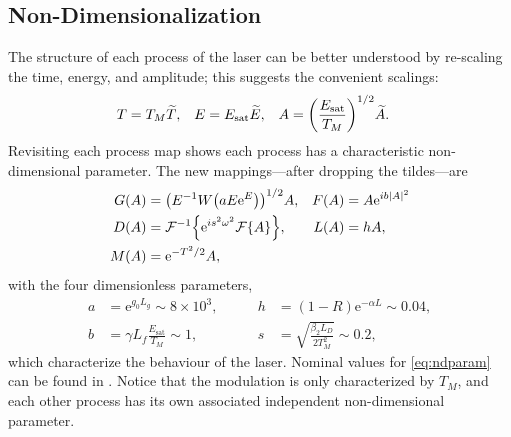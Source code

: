 \documentclass[10pt,twocolumn,a4paper]{article}
\let\originalleft\left
\let\originalright\right
\renewcommand{\left}{\mathopen{}\mathclose\bgroup\originalleft}
\renewcommand{\right}{\aftergroup\egroup\originalright}
\newcommand{\Es}{E_{\textrm{sat}}}
\newcommand{\FT}[1]{\mathcal{F}\left\{ #1 \right\}}
\newcommand{\FTi}[1]{\mathcal{F}^{-1}\left\{ #1 \right\}}
\begin{document}
\subsection{Non-Dimensionalization}
The structure of each process of the laser can be better understood by re-scaling the time, energy, and amplitude; this suggests the convenient scalings:
\begin{align}
	T &= T_M \widetilde{T},& E &= \Es \widetilde{E},& A &= \left( \frac{\Es}{T_M} \right)^{1/2} \widetilde{A}.
\end{align}
Revisiting each process map shows each process has a characteristic non-dimensional parameter. The new mappings---after dropping the tildes---are
\begin{equation}
	\begin{aligned}
		G(A) &= \left(E^{-1} W \left( a E \textrm{e}^{E}\right) \right)^{1/2} A, & F(A) &= A \textrm{e}^{i b |A|^2} \\
		D(A) &= \FTi{\textrm{e}^{i s^2 \omega^2} \FT{A}}, & L(A) &= h A, \\
		M(A) &= \textrm{e}^{-T^2 / 2} A,
		\label{eq:effects}
	\end{aligned}
\end{equation}
with the four dimensionless parameters,
\begin{equation}
	\begin{aligned}
		a &= \textrm{e}^{g_0 L_g} \sim 8 \times 10^3,& \qquad h &= (1 - R) \textrm{e}^{-\alpha L} \sim 0.04, \\
		b &= \gamma L_f \frac{\Es}{T_M} \sim 1,& \qquad s &= \sqrt{\frac{\beta_2 L_D}{2 T_M^2}} \sim 0.2,
		\label{eq:ndparam}
	\end{aligned}
\end{equation}
which characterize the behaviour of the laser. Nominal values for \eqref{eq:ndparam} can be found in \cite{agrawal2002, agrawal2013, bohun, burgoyne2014, burgoyneemail, finot, li, litchinitser, peng, shtyrina, tamura1993, tamura1996, tomlinson, usechak, yamashita, yarutkina}. Notice that the modulation is only characterized by $T_M$, and each other process has its own associated independent non-dimensional parameter.
\end{document}
